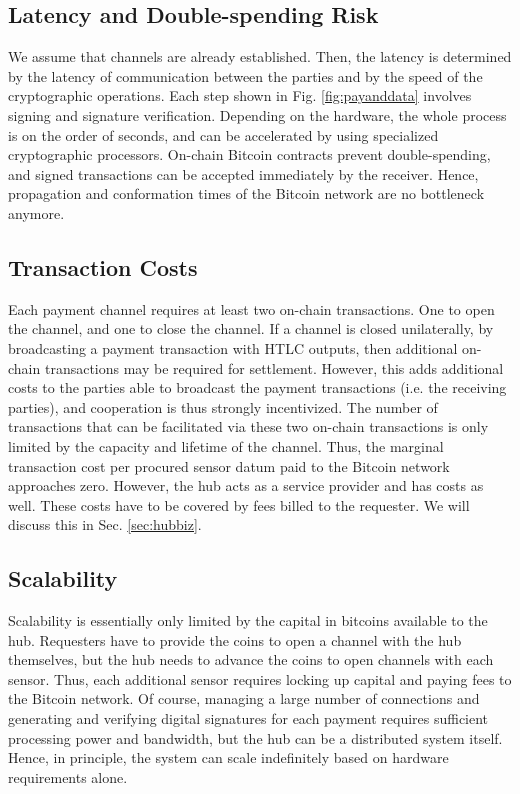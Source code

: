 \subsection{Latency and Double-spending Risk}

We assume that channels are already established. Then, the latency is determined by the latency of communication between the parties and by the speed of the cryptographic operations. Each step shown in Fig. \ref{fig:payanddata} involves signing and signature verification. Depending on the hardware, the whole process is on the order of seconds, and can be accelerated by using specialized cryptographic processors. On-chain Bitcoin contracts prevent double-spending, and signed transactions can be accepted immediately by the receiver. Hence, propagation and conformation times of the Bitcoin network are no bottleneck anymore.

\subsection{Transaction Costs}

Each payment channel requires at least two on-chain transactions. One to open the channel, and one to close the channel. If a channel is closed unilaterally, by broadcasting a payment transaction with \ac{HTLC} outputs, then additional on-chain transactions may be required for settlement. However, this adds additional costs to the parties able to broadcast the payment transactions (i.e. the receiving parties), and cooperation is thus strongly incentivized. 
The number of transactions that can be facilitated via these two on-chain transactions is only limited by the capacity and lifetime of the channel. Thus, the marginal transaction cost per procured sensor datum paid to the Bitcoin network approaches zero. However, the hub acts as a service provider and has costs as well. These costs have to be covered by fees billed to the requester. We will discuss this in Sec. \ref{sec:hubbiz}.

\subsection{Scalability}

Scalability is essentially only limited by the capital in bitcoins available to the hub. Requesters have to provide the coins to open a channel with the hub themselves, but the hub needs to advance the coins to open channels with each sensor. Thus, each additional sensor requires locking up capital and paying fees to the Bitcoin network. Of course, managing a large number of connections and generating and verifying digital signatures for each payment requires sufficient processing power and bandwidth, but the hub can be a distributed system itself. Hence, in principle, the system can scale indefinitely based on hardware requirements alone.

